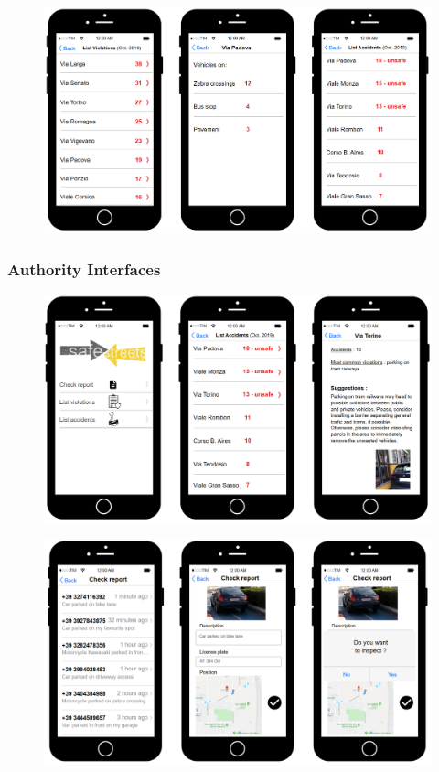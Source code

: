 \begin{figure}
[H]
\includegraphics[scale=0.5]{Images/Templates/User/us_4.PNG}
\end{figure}

\subsubsection{Authority Interfaces}
\begin{figure}
[H]
\includegraphics[scale=0.48]{Images/Templates/Authority/auth_0.PNG}
\end{figure}

\begin{figure}
[H]
\includegraphics[scale=0.49]{Images/Templates/Authority/auth_1.PNG}
\end{figure}

